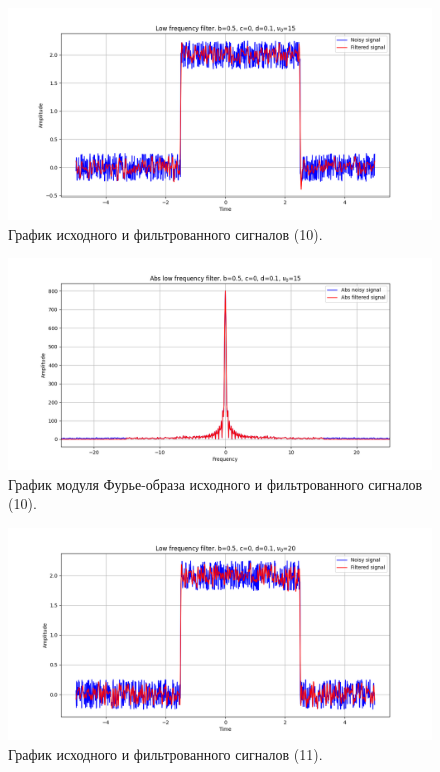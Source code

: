 \documentclass[a4paper, 12pt]{article}
\begin{document}
    \begin{figure}[!htb]
        \centering
        \includegraphics[scale=0.48]{7_u_flt_u_nohigh.png}
        \captionsetup{skip=0pt}
        \caption{График исходного и фильтрованного сигналов (10).}
        \label{fig:fig19}
    \end{figure}
    \begin{figure}[!htb]
        \centering
        \includegraphics[scale=0.48]{7_abs_u_U_nohigh.png}
        \captionsetup{skip=0pt}
        \caption{График модуля Фурье-образа исходного и фильтрованного сигналов (10).}
        \label{fig:fig20}
    \end{figure}
    \begin{figure}[!htb]
        \centering
        \includegraphics[scale=0.48]{6_u_flt_u_nohigh.png}
        \captionsetup{skip=0pt}
        \caption{График исходного и фильтрованного сигналов (11).}
        \label{fig:fig21}
    \end{figure}
\end{document}
